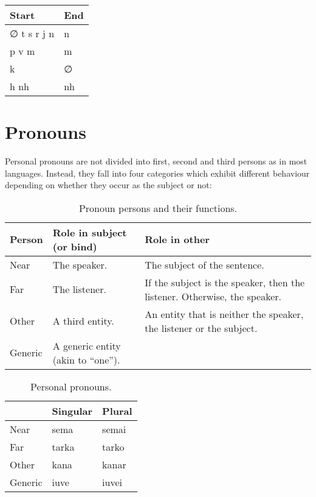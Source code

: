 \documentclass{book}
\newcommand{\invalid}{\cellcolor{RedOrange!40}}
\begin{document}
\begin{table}[h]
    \centering
    \begin{tabular}{|l|l|}
        \hline
        Start & End \\
        \hline
        ∅ t s r j n & n \\
        p v m & m \\
        k & ∅ \\
        h nh & nh \\
        \hline
    \end{tabular}
\end{table}

\section{Pronouns}

Personal pronouns are not divided into first, second and third persons as in most languages. Instead, they fall into four categories which exhibit different behaviour depending on whether they occur as the subject or not:

\begin{table}[h]
    \caption{Pronoun persons and their functions.}
    \centering
    \begin{tabu} to \textwidth {|l|l|X|}
        \hline
        Person & Role in subject (or bind) & Role in other \\
        \hline
        Near & The speaker. & The subject of the sentence. \\
        Far & The listener. & If the subject is the speaker, then the listener. Otherwise, the speaker. \\
        Other & A third entity. & An entity that is neither the speaker, the listener or the subject. \\
        Generic & A generic entity (akin to ``one''). & \invalid \\
        \hline
    \end{tabu}
\end{table}

\begin{table}[h]
    \caption{Personal pronouns.}
    \centering
    \begin{tabular}{|l|l|l|}
        \hline
        & Singular & Plural \\
        \hline
        Near & sema & semai \\
        Far & tarka & tarko \\
        Other & kana & kanar \\
        Generic & iuve & iuvei \\
        \hline
    \end{tabular}
\end{table}
\end{document}
